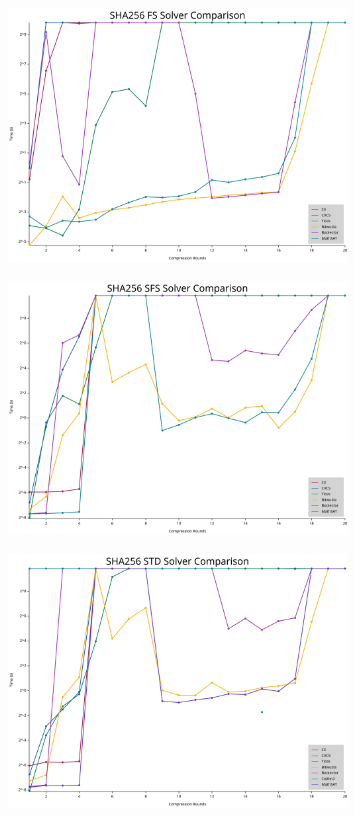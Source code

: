 \begin{figure}[H]
	\centering
	\includegraphics[width=0.8\textwidth]{../../graphs/solver_comparison_SHA256_FS.svg}
\end{figure}

\begin{figure}[H]
	\centering
	\includegraphics[width=0.8\textwidth]{../../graphs/solver_comparison_SHA256_SFS.svg}
\end{figure}

\begin{figure}[H]
	\centering
	\includegraphics[width=0.8\textwidth]{../../graphs/solver_comparison_SHA256_STD.svg}
\end{figure}


